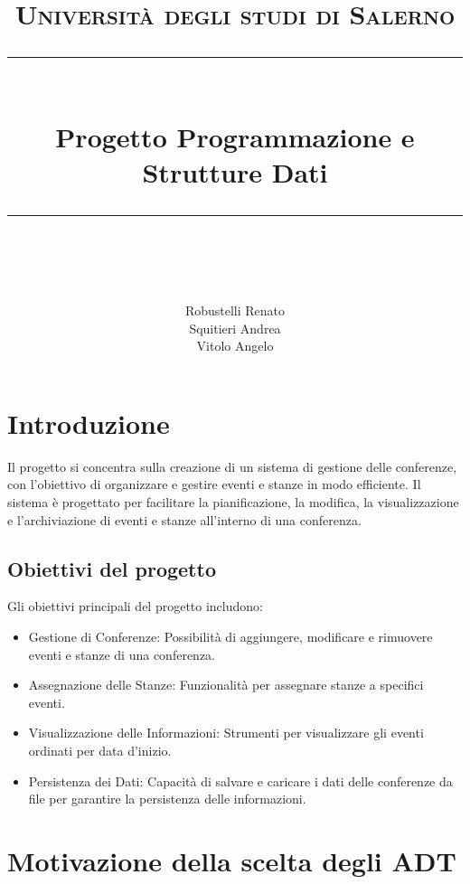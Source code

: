 \documentclass[11pt]{scrartcl} %
\title{
	\normalfont\normalsize
	\textsc{Università degli studi di Salerno}\\ %
	\vspace{25pt} %
	\rule{\linewidth}{0.5pt}\\ %
	\vspace{20pt} %
	{\huge Progetto Programmazione e Strutture Dati}\\ %
	\vspace{12pt} %
	\rule{\linewidth}{2pt}\\ %
	\vspace{12pt} %
}
\author{
	\LARGE
	Robustelli Renato \\
	\LARGE
	Squitieri Andrea \\
	\LARGE
	Vitolo Angelo
} %
\date{\null}
\begin{document}
\maketitle %

\tableofcontents


\section{Introduzione}




Il progetto si concentra sulla creazione di un sistema di gestione delle conferenze, con l'obiettivo di organizzare e gestire eventi e stanze in modo efficiente. Il sistema è progettato per facilitare la pianificazione, la modifica, la visualizzazione e l'archiviazione di eventi e stanze all'interno di una conferenza.



\subsection{Obiettivi del progetto}
Gli obiettivi principali del progetto includono:

\begin{itemize}
	\item  Gestione di Conferenze: Possibilità di aggiungere, modificare e rimuovere eventi e stanze di una conferenza.
	\item Assegnazione delle Stanze: Funzionalità per assegnare stanze a specifici eventi.
	\item Visualizzazione delle Informazioni: Strumenti per visualizzare gli eventi ordinati per data d'inizio.
	\item Persistenza dei Dati: Capacità di salvare e caricare i dati delle conferenze da file per garantire la persistenza delle informazioni.
\end{itemize}


\section{Motivazione della scelta degli ADT}
\end{document}
